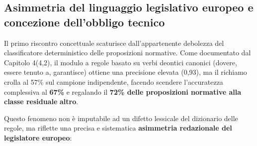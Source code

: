 \documentclass[12pt,a4paper,oneside]{report}
\begin{document}
\subsection{Asimmetria del linguaggio legislativo europeo e concezione dell'obbligo tecnico}
Il primo riscontro concettuale scaturisce dall'appartenente debolezza del classificatore deterministico delle proposizioni normative. Come documentato dal Capitolo 4(4,2), il modulo a regole basato su verbi deontici canonici (dovere, essere tenuto a, garantisce) ottiene una precisione elevata (0,93), ma il richiamo crolla al 57\% sul campione indipendente, facendo scendere l'accuratezza complessiva al \textbf{67\%} e regalando il \textbf{72\% delle proposizioni normative alla classe residuale} \textbf{altro}.

Questo fenomeno non è imputabile ad un difetto lessicale del dizionario delle regole, ma riflette una precisa e sistematica \textbf{asimmetria redazionale del legislatore europeo}:
\end{document}
